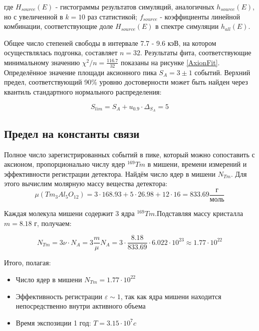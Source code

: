 \documentclass[a4paper,article,14pt]{extarticle}
\begin{document}
где $H_{source}\left( E \right)$ - гистограммы результатов симуляций, аналогичных $h_{source}\left( E \right)$, но с увеличенной в $k=10$ раз статистикой; $f_{source}$ - коэффициенты линейной комбинации, соответствующие доле $H_{source}\left( E \right)$ в спектре симуляции $h_{all} \left( E \right)$.

Общее число степеней свободы в интервале 7.7 - 9.6 кэВ, на котором осуществлялась подгонка, составляет $n = 32$. Результаты фита, соответствующие минимальному значению $\chi^2 /n = \frac{116.7}{32}$ показаны на рисунке \ref{AxionFit}. Определённое значение площади аксионного пика $S_A = 3 \pm 1$ событий. Верхний предел, соответствующий 90\% уровню достоверности может быть найден через квантиль стандартного нормального распределения:

\begin{equation}
    S_{lim} = S_A + u_{0.9} \cdot \Delta_{S_A} = 5
\end{equation}

\subsection{Предел на константы связи}
Полное число зарегистрированных событий в пике, который можно сопоставить с аксионом, пропорционально числу ядер $^{169}Tm$ в мишени, времени измерений и эффективности регистрации детектора. Найдём число ядер в мишени ${N_{Tm}}$. Для этого вычислим молярную массу вещества детектора:
\begin{equation}
    \mu \left( {T{m_3}A{l_5}{O_{12}}} \right) = 3 \cdot 168.93 + 5 \cdot 26.98 + 12 \cdot 16 = 833.69\frac{\text{г}}{{\text{моль}}}
\end{equation}

Каждая молекула мишени содержит 3 ядра $^{169}Tm$.Подставляя массу кристалла $m= 8.18 \text{ г}$, получаем:

\begin{equation}
    {N_{Tm}} = 3\nu  \cdot {N_A} = 3\frac{m}{\mu }{N_A} = 3 \cdot \frac{{8.18}}{{833.69}} \cdot 6.022 \cdot {10^{23}} \approx 1.77 \cdot {10^{22}}
\end{equation}

Итого, полагая:
\begin{itemize}
    \item Число ядер в мишени $N_{Tm} = 1.77 \cdot {10^{22}}$
    \item Эффективность регистрации $\varepsilon \sim 1 $, так как ядра мишени находится непосредственно внутри активного объема
    \item Время экспозиции 1 год: $T = 3.15 \cdot {10^7} c$
\end{itemize}
\end{document}
